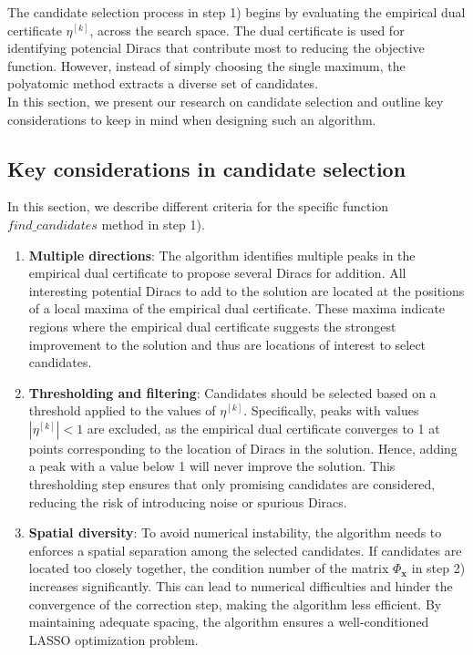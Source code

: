 \documentclass[a4paper,12pt,oneside]{report}
\theoremstyle{named}
\begin{document}
The candidate selection process in step 1) begins by evaluating the empirical dual certificate $\eta^{[k]}$, across the search space. The dual certificate is used for identifying potencial Diracs that contribute most to reducing the objective function. However, instead of simply choosing the single maximum, the polyatomic method extracts a diverse set of candidates.\\

In this section, we present our research on candidate selection and outline key considerations to keep in mind when designing such an algorithm.

\subsection{Key considerations in candidate selection}
In this section, we describe different criteria for the specific function $find\_candidates$ method in step 1).
\begin{enumerate}
    \item \textbf{Multiple directions}: The algorithm identifies multiple peaks in the empirical dual certificate to propose several Diracs for addition. All interesting potential Diracs to add to the solution are located at the positions of a local maxima of the empirical dual certificate. These maxima indicate regions where the empirical dual certificate suggests the strongest improvement to the solution and thus are locations of interest to select candidates.
    \item \textbf{Thresholding and filtering}: Candidates should be selected based on a threshold applied to the values of $\eta^{[k]}$. Specifically, peaks with values $|\eta^{[k]}| < 1$ are excluded, as the empirical dual certificate converges to 1 at points corresponding to the location of Diracs in the solution. Hence, adding a peak with a value below 1 will never improve the solution. This thresholding step ensures that only promising candidates are considered, reducing the risk of introducing noise or spurious Diracs. 
    \item \textbf{Spatial diversity}: To avoid numerical instability, the algorithm needs to enforces a spatial separation among the selected candidates. If candidates are located too closely together, the condition number of the matrix $\Phi_\mathbf{x}$ in step 2) increases significantly. This can lead to numerical difficulties and hinder the convergence of the correction step, making the algorithm less efficient. By maintaining adequate spacing, the algorithm ensures a well-conditioned LASSO optimization problem.
\end{enumerate}
\end{document}
